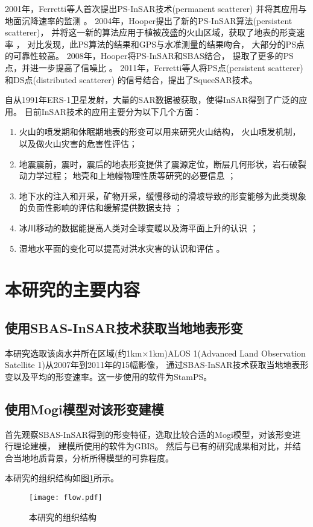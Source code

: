 2001年，Ferretti等人首次提出PS-InSAR技术(permanent scatterer)
\cite{ferrettiPermanentScatterersSAR2001}
并将其应用与地面沉降速率的监测
\cite{ferrettiNonlinearSubsidenceRate2000}。
2004年，Hooper提出了新的PS-InSAR算法(persistent scatterer)，
并将这一新的算法应用于植被茂盛的火山区域，获取了地表的形变速率
\cite{hooperNewMethodMeasuring2004}，
对比发现，此PS算法的结果和GPS与水准测量的结果吻合，
大部分的PS点的可靠性较高。
2008年，Hooper将PS-InSAR和SBAS结合，
提取了更多的PS点，并进一步提高了信噪比
\cite{hooperMultitemporalInSARMethod2008}。
2011年，Ferretti等人将PS点(persistent scatterer)和DS点(distributed scatterer)
的信号结合，提出了SqueeSAR技术。

自从1991年ERS-1卫星发射，大量的SAR数据被获取，使得InSAR得到了广泛的应用。
目前InSAR技术的应用主要分为以下几个方面：
\begin{enumerate}
  \item 火山的喷发期和休眠期地表的形变可以用来研究火山结构，
  火山喷发机制，以及做火山灾害的危害性评估\cite{luInSARImagingVolcanic2007}；
  \item 地震震前，震时，震后的地表形变提供了震源定位，断层几何形状，岩石破裂动力学过程；
  地壳和上地幔物理性质等研究的必要信息
  \cite{massonnetDisplacementFieldLanders1993,biggsMultiinterferogramMethodMeasuring2007}；
  \item 地下水的注入和开采，矿物开采，缓慢移动的滑坡导致的形变能够为此类现象的负面性影响的评估和缓解提供数据支持
  \cite{zhangMappingGroundSurface2012,zhaoLargeareaLandslideDetection2012}；
  \item 冰川移动的数据能提高人类对全球变暖以及海平面上升的认识
  \cite{rignotMassBalancePolar2002}；
  \item 湿地水平面的变化可以提高对洪水灾害的认识和评估
  \cite{luRadarsat1ERSInSAR2008}。
\end{enumerate}

\section{本研究的主要内容}

\subsection{使用SBAS-InSAR技术获取当地地表形变}
本研究选取该卤水井所在区域(约1km×1km)ALOS 1(Advanced Land Observation Satellite 1)从2007年到2011年的15幅影像，
通过SBAS-InSAR技术获取当地地表形变以及平均的形变速率。这一步使用的软件为StamPS\cite{hooperMultitemporalInSARMethod2008}。


\subsection{使用Mogi模型对该形变建模}
首先观察SBAS-InSAR得到的形变特征，选取比较合适的Mogi\cite{mogiRelationsEruptionsVarious1958}模型，对该形变进行理论建模，
建模所使用的软件为GBIS\cite{bagnardiInversionSurfaceDeformation2018}。
然后与已有的研究成果相对比，并结合当地地质背景，分析所得模型的可靠程度。

本研究的组织结构如图\ref{fig:flow}所示。
\begin{figure}[htb]
  \centering
  \texttt{[image: flow.pdf]}
  \caption{本研究的组织结构}
  \label{fig:flow}
\end{figure}